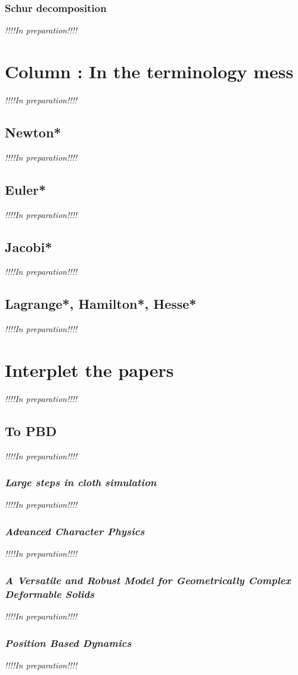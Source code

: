 \documentclass[pdflatex,sn-mathphys-num]{sn-jnl}%
\theoremstyle{thmstyleone}%
\theoremstyle{thmstyletwo}%
\theoremstyle{thmstylethree}%
\newcommand{\inprep}{
	\begin{center}
		\sl\rm {!!!!In preparation!!!!}
\end{center}}
\begin{document}
\subsubsection{Schur decomposition}
\inprep

\section{Column : In the terminology mess}
\inprep
\subsection{Newton*}
\inprep
\subsection{Euler*}
\inprep
\subsection{Jacobi*}
\inprep
\subsection{Lagrange*, Hamilton*, Hesse*}
\inprep

\section{Interplet the papers}
\inprep
\subsection{To PBD}
\inprep
\subsubsection{{\sl Large steps in cloth simulation}\cite{LargeStepBaraff}}
\inprep
\subsubsection{{\sl Advanced Character Physics}\cite{Jakobsen2003AdvancedCP}}
\inprep
\subsubsection{\small{\sl A Versatile and Robust Model for Geometrically Complex Deformable Solids}\cite{VersatileTeschner}}
\inprep
\subsubsection{{\sl Position Based Dynamics}\cite{PBD}}
\inprep
\end{document}

